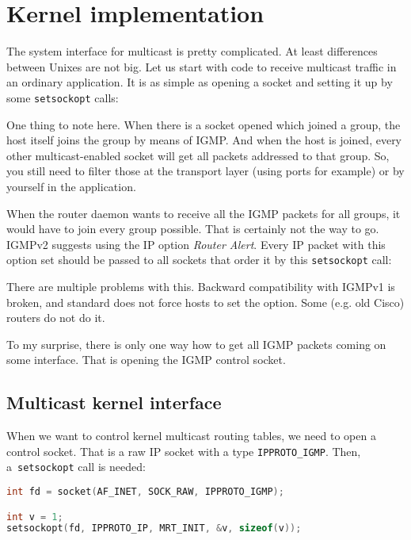 \def\setsockopt{\texttt{set\-sock\-opt} }
\section{Kernel implementation}

The system interface for multicast is pretty complicated. At least differences
between Unixes are not big. Let us start with code to receive multicast traffic
in an ordinary application. It is as simple as opening a socket and setting it
up by some \setsockopt calls:



\noindent One thing to note here. When there is a socket opened which joined a group, the host itself joins the group by means of IGMP. And when the host is
joined, every other multicast-enabled socket will get all packets addressed to that
group. So, you still need to filter those at the transport layer (using ports
for example) or by yourself in the application.

When the router daemon wants to receive all the IGMP packets for all groups, it
would have to join every group possible. That is certainly not the way to go.
IGMPv2 suggests using the IP option \emph{Router Alert}. Every IP packet with this option
set should be passed to all sockets that order it by this \setsockopt call:



\noindent There are multiple problems with this. Backward compatibility with
IGMPv1 is broken, and standard does not force hosts to set the option. Some (e.g.
old Cisco) routers do not do it.

To my surprise, there is only one way how to get all IGMP packets coming on
some interface. That is opening the IGMP control socket.

\subsection{Multicast kernel interface}
\label{mcast-kernel}

When we want to control kernel multicast routing tables, we need to open
a control socket. That is a raw IP socket with a type \texttt{IPPROTO\_IGMP}.
Then, a~\setsockopt call is needed:

\begin{lstlisting}[language=c]
int fd = socket(AF_INET, SOCK_RAW, IPPROTO_IGMP);

int v = 1;
setsockopt(fd, IPPROTO_IP, MRT_INIT, &v, sizeof(v));
\end{lstlisting}

